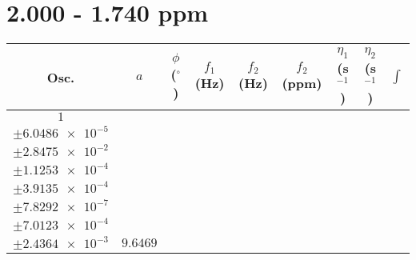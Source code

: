 \documentclass[8pt]{article}
\begin{document}
\section*{2.000 - 1.740 ppm}
\begin{longtable}[l]{c c c c c c c c c}
\toprule
Osc. & $a$ & $\phi$ ($^{\circ}$) & $f_1$ (Hz) & $f_2$ (Hz) & $f_2$ (ppm) & $\eta_1$ (s$^{-1}$) & $\eta_2$ (s$^{-1}$) & $\int$\\
\midrule
$\num{1}$ & \begin{tabular}[c]{@{}c@{}}$\num{0.12297}$ \\ $\pm\num{6.0486e-5}$\end{tabular} & \begin{tabular}[c]{@{}c@{}}$\num{-0.32818}$ \\ $\pm\num{2.8475e-2}$\end{tabular} & \begin{tabular}[c]{@{}c@{}}$\num{-6.6489}$ \\ $\pm\num{1.1253e-4}$\end{tabular} & \begin{tabular}[c]{@{}c@{}}$\num{937.94}$ \\ $\pm\num{3.9135e-4}$\end{tabular} & \begin{tabular}[c]{@{}c@{}}$\num{1.8764}$ \\ $\pm\num{7.8292e-7}$\end{tabular} & \begin{tabular}[c]{@{}c@{}}$\num{1.1767}$ \\ $\pm\num{7.0123e-4}$\end{tabular} & \begin{tabular}[c]{@{}c@{}}$\num{4.2864}$ \\ $\pm\num{2.4364e-3}$\end{tabular} & $\num{9.6469}$\\

\end{longtable}
\end{document}
